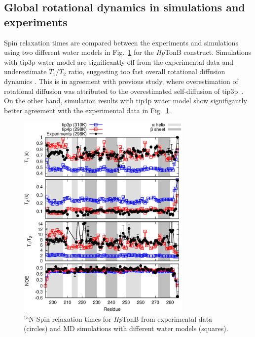\documentclass[pre,aps,floatfix,authordate1-4,twocolumn]{revtex4-1}
\begin{document}
\subsection{Global rotational dynamics in simulations and experiments}

Spin relaxation times are compared between the experiments and simulations using two
different water models in Fig.~\ref{HpTonBrelaxationDATA} for the {\it Hp}TonB construct.
Simulations with tip3p water model are significantly
off from the experimental data and underestimate $T_1/T_2$ ratio, suggesting too
fast overall rotational diffusion dynamics \cite{carper97}.
This is in agreement with previous study, where overestimation of
rotational diffusion was attributed to the overestimated self-diffusion of tip3p~\cite{wong08}.
On the other hand, simulation results with tip4p water model show signifigantly
better agreement with the experimental data in  Fig.~\ref{HpTonBrelaxationDATA}.
\begin{figure}[!h]
  \includegraphics[width=8.5cm]{../Figs/HpTonBrelaxationDATA.eps}%
  \caption{$^{15}$N Spin relaxation times for {\it Hp}TonB from experimental data (circles)
    and MD simulations with different water models (squares).
    \label{HpTonBrelaxationDATA}}%
\end{figure}
\end{document}

